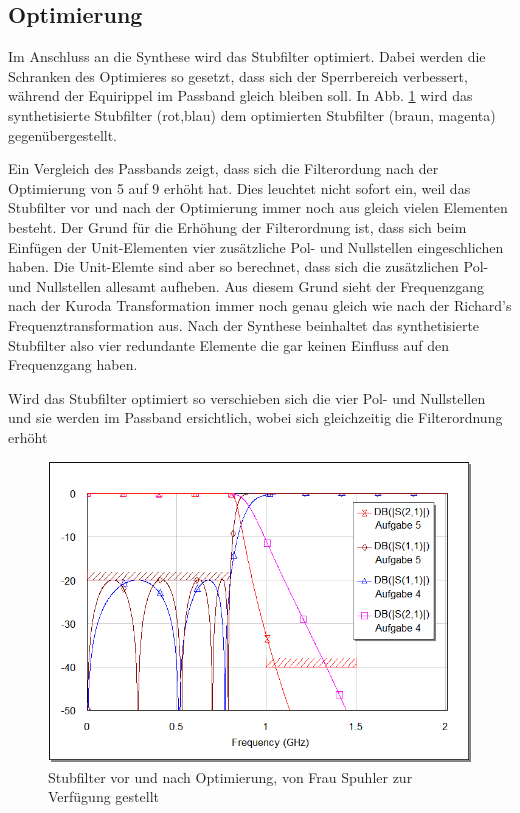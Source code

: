 \subsection{Optimierung}

Im Anschluss an die Synthese wird das Stubfilter optimiert. Dabei werden die Schranken des Optimieres so gesetzt, dass sich der Sperrbereich verbessert, während der Equirippel im Passband gleich bleiben soll. In Abb. \ref{fig:vor-nach-optimierung} wird das synthetisierte Stubfilter (rot,blau) dem optimierten Stubfilter (braun, magenta) gegenübergestellt. 

Ein Vergleich des Passbands zeigt, dass sich die Filterordung nach der Optimierung von 5 auf 9 erhöht hat. Dies leuchtet nicht sofort ein, weil das Stubfilter vor und nach der Optimierung immer noch aus gleich vielen Elementen besteht. Der Grund für die Erhöhung der Filterordnung ist, dass sich beim Einfügen der Unit-Elementen vier zusätzliche Pol- und Nullstellen eingeschlichen haben. Die Unit-Elemte sind aber so berechnet, dass sich die zusätzlichen Pol- und Nullstellen allesamt aufheben. Aus diesem Grund sieht der Frequenzgang nach der Kuroda Transformation immer noch genau gleich wie nach der Richard's Frequenztransformation aus. Nach der Synthese beinhaltet das synthetisierte Stubfilter also vier redundante Elemente die gar keinen Einfluss auf den Frequenzgang haben. 

Wird das Stubfilter optimiert so verschieben sich die vier Pol- und Nullstellen und sie werden im Passband ersichtlich, wobei sich gleichzeitig die Filterordnung erhöht


\begin{figure}[h!]
    \centering
    \includegraphics[width=\linewidth]{images/graph-optimierung}
    \caption{Stubfilter vor und nach Optimierung, von Frau Spuhler zur Verfügung gestellt}
    \label{fig:vor-nach-optimierung}
\end{figure}

